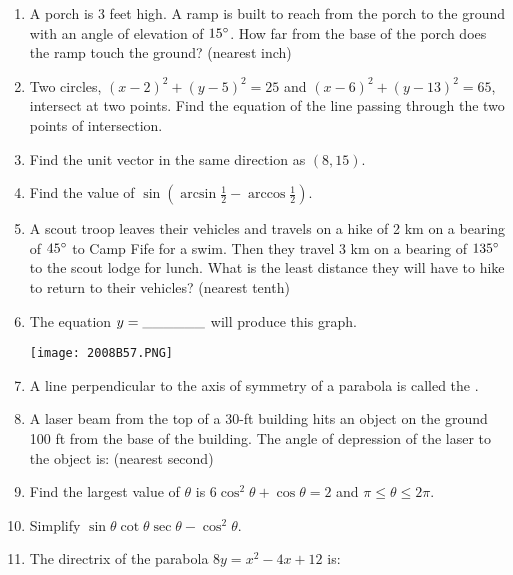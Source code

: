 \documentclass[../uilmath.tex]{subfiles}
\begin{document}
\begin{enumerate}[label=\bfseries\arabic*.]
    \item %
    A porch is 3 feet high. A ramp is built to reach from the porch to the ground with an angle of elevation of $15\degree$.
    How far from the base of the porch does the ramp touch the ground? (nearest inch)

    \item %
    Two circles, $(x-2)^2+(y-5)^2=25$ and $(x-6)^2+(y-13)^2=65$, intersect at two points. Find the equation of the line passing through the two points of intersection.

    \item %
    Find the unit vector in the same direction as $(8,15)$.

    \item %
    Find the value of $\sin(\arcsin\frac{1}{2}-\arccos \frac{1}{2})$.

    \item %
    A scout troop leaves their vehicles and travels on a hike of 2 km on a bearing of $45\degree$ to Camp Fife for a swim. Then they travel 3 km on a bearing of $135\degree$ to the scout lodge for lunch. What is the 
    least distance they will have to hike to return to their vehicles? (nearest tenth)

    \item %
    The equation $y=\_\_\_\_\_\_$ will produce this graph.
    \begin{center}
        \texttt{[image: 2008B57.PNG]}
    \end{center}

    \item %
    A line perpendicular to the axis of symmetry of a parabola is called the \blank .

    \item %
    A laser beam from the top of a 30-ft building hits an object on the ground 100 ft from the base of the building. The angle of depression of the laser to the object is: (nearest second)

    \item %
    Find the largest value of $\theta$ is $6\cos^2\theta + \cos\theta = 2$ and $\pi\leq \theta\leq 2\pi$.

    \item %
    Simplify $\sin\theta\cot\theta\sec\theta-\cos^2\theta$.

    \item %
    The directrix of the parabola $8y=x^2-4x+12$ is: 


\end{enumerate}
\end{document}
